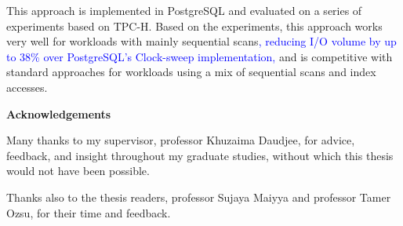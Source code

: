 This approach is implemented in PostgreSQL and evaluated on a series of experiments based on TPC-H. Based on the experiments, this approach works very well for workloads with mainly sequential scans\textcolor{blue}{, reducing I/O volume by up to 38\% over PostgreSQL's Clock-sweep implementation,} and is competitive with standard approaches for workloads using a mix of sequential scans and index accesses.


\cleardoublepage
{}    %

\begin{center}\textbf{Acknowledgements}\end{center}

Many thanks to my supervisor, professor Khuzaima Daudjee, for advice, feedback, and insight throughout my graduate studies, without which this thesis would not have been possible.

Thanks also to the thesis readers, professor Sujaya Maiyya and professor Tamer Ozsu, for their time and feedback.



\cleardoublepage
{}    %




\renewcommand\contentsname{Table of Contents}
\tableofcontents
\cleardoublepage
{}    %

\listoffigures
\cleardoublepage
{}		%


\renewcommand*{\abbreviationsname}{List of Abbreviations}
\printglossary[type=abbreviations]
\cleardoublepage
{}		%




